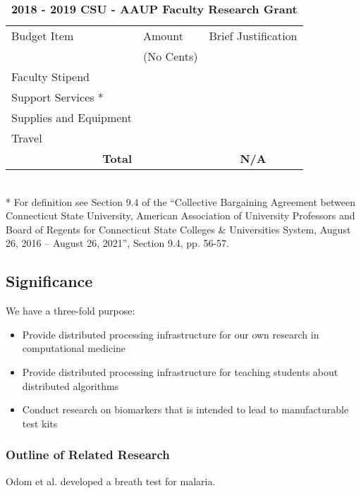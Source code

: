 \documentclass[]{article}
\begin{document}
\begin{table}[H]
	\caption{\textbf{2018 - 2019 CSU - AAUP Faculty Research Grant}}
\begin{tabular}{|p{4cm}|p{3cm}|c|}
	\hline 
Budget Item	&Amount &  Brief Justification\\ 
 	&(No Cents) &   \\ 
	\hline 
Faculty Stipend	&  &  \\ 
	\hline 
Support Services *	&  &  \\ 
	\hline 
Supplies and Equipment	&  &  \\ 
	\hline 
Travel	&  &  \\ 
	\hline \hline
 \multicolumn{1}{|r|}{\textbf{Total}}	&  & \textbf{N/A} \\ 
	\hline 
\end{tabular} \\
* For definition see Section 9.4 of the ``Collective Bargaining Agreement between Connecticut State University, American Association of University Professors and Board of Regents for Connecticut State Colleges \& Universities System, August 26, 2016 – August 26, 2021'', Section 9.4, pp. 56-57.
\end{table}


\subsection{Significance}%
We have a three-fold purpose: 
\begin{itemize}
	\item Provide distributed processing infrastructure for our own research in computational medicine
	\item Provide distributed processing infrastructure for teaching students about distributed algorithms
	\item Conduct research on biomarkers that is intended to lead to manufacturable test kits
\end{itemize}

\subsubsection{Outline of Related Research}%
Odom et al. \cite{kelly2015malaria} developed a breath test for malaria.
\end{document}
